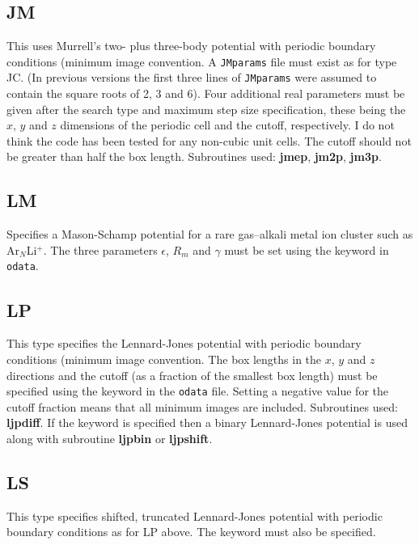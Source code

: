 {{{\subsection{JM}This uses Murrell's two- plus three-body 
potential\cite{murrellm90,murrellr90,alderzijmr91,eggenjlm92,fengjm93} with periodic boundary
conditions (minimum image convention.\cite{allent87} 
A {\tt JMparams} file must exist as for type JC. (In previous versions the 
first three lines of {\tt JMparams} were assumed to contain
the square roots of 2, 3 and 6). Four additional real parameters must be given after the
search type and maximum step size specification, these being the $x$, $y$ and $z$ dimensions
of the periodic cell and the cutoff, respectively. I do not think the code has been tested
for any non-cubic unit cells. The cutoff should not be greater than half the box length.\cite{allent87}
Subroutines used: {\bf jmep}, {\bf jm2p}, {\bf jm3p}.

\subsection{LM}Specifies a Mason-Schamp potential\cite{Mason58} for a rare gas--alkali metal ion cluster
such as Ar$_{N}$Li$^+$. The three parameters $\epsilon$, $R_m$ and $\gamma$
must be set using the {} keyword in {\tt odata}.

\subsection{LP}This type specifies the Lennard-Jones potential with 
periodic boundary conditions (minimum image convention.\cite{allent87}
The box lengths in the $x$, $y$ and $z$ 
directions and the cutoff (as a fraction of the smallest box length)
must be specified using the {} keyword in the {\tt odata} file.
Setting a negative value for the cutoff fraction means that all minimum
images are included.
Subroutines used: {\bf ljpdiff}.
If the {} keyword is specified then a binary Lennard-Jones
potential is used\cite{sastryds98} along with subroutine {\bf ljpbin} or {\bf ljpshift}.

\subsection{LS}This type specifies shifted, truncated Lennard-Jones potential with 
periodic boundary conditions as for LP above. The {} keyword must also be 
specified.

}}}
